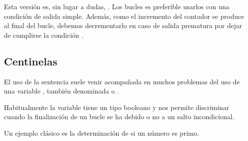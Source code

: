 \documentclass[letterpaper,10pt,english]{sphinxmanual}
\begin{document}

Esta versión es, sin lugar a dudas, . Los bucles 
es preferible usarlos con una condición de salida simple. Además, como
el incremento del contador 
se produce al final del bucle, debemos decrementarlo en caso de
salida prematura por dejar de cumplirse la condición .


\subsection{Centinelas}
\label{\detokenize{break:centinelas}}
El uso de la sentencia  suele venir acompañada en muchos problemas del
uso de una variable , también denominada  o .

Habitualmente la variable  tiene un tipo booleano y nos permite
discriminar cuando la finalización de un bucle se ha debido o no a un salto
incondicional.

Un ejemplo clásico es la determinación de si un número es primo.

\newpage

\end{document}
